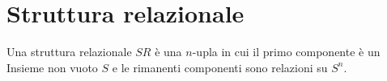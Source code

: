 \section{Struttura relazionale}
Una struttura relazionale $SR$ è una $n$-upla in cui il primo componente è un Insieme
non vuoto $S$ e le rimanenti componenti sono relazioni su $S^n$.







